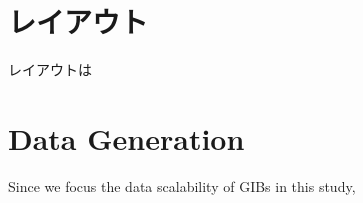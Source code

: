\documentclass{vgtc}                          %
\begin{document}
\section{レイアウト}
レイアウトは

\section{Data Generation}
Since we focus the data scalability of GIBs in this study, 


%

%
%
%


\end{document}

